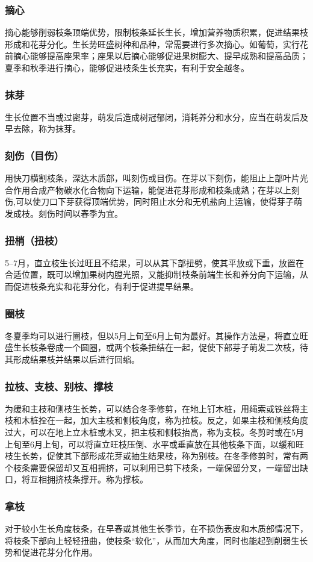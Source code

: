 \documentclass{ctexbook}
\begin{document}
\subsubsection{摘心}
摘心能够削弱枝条顶端优势，限制枝条延长生长，增加营养物质积累，促进结果枝形成和花芽分化。生长势旺盛树种和品种，常需要进行多次摘心。如葡萄，实行花前摘心能够提高座果率；座果以后摘心能够促进果树膨大、提早成熟和提高品质；夏季和秋季进行摘心，能够促进枝条生长充实，有利于安全越冬。
\subsubsection{抹芽}
生长位置不当或过密芽，萌发后造成树冠郁闭，消耗养分和水分，应当在萌发后及早去除，称为抹芽。
\subsubsection{刻伤（目伤）}
用快刀横割枝条，深达木质部，叫刻伤或目伤。在芽以下刻伤，能阻止上部叶片光合作用合成产物碳水化合物向下运输，能促进花芽形成和枝条成熟；在芽以上刻伤,可以使刀口下芽获得顶端优势，同时阻止水分和无机盐向上运输，使得芽子萌发成枝。刻伤时间以春季为宜。
\subsubsection{扭梢（扭枝）}
5--7月，直立枝生长过旺且不结果，可以从其下部扭劈，使其平放或下垂，放置在合适位置，既可以增加果树内膛光照，又能抑制枝条前端生长和养分向下运输，从而促进枝条充实和花芽分化，有利于促进提早结果。
\subsubsection{圈枝}
冬夏季均可以进行圈枝，但以5月上旬至6月上旬为最好。其操作方法是，将直立旺盛生长枝条卷成一个圆圈，或两个枝条扭结在一起，促使下部芽子萌发二次枝，待其形成结果枝并结果以后进行回缩。
\subsubsection{拉枝、支枝、别枝、撑枝}
为缓和主枝和侧枝生长势，可以结合冬季修剪，在地上钉木桩，用绳索或铁丝将主枝和木桩拴在一起，加大主枝和侧枝角度，称为拉枝。反之，如果主枝和侧枝角度过大，可以在地上立木桩或木叉，把主枝和侧枝抬高，称为支枝。冬剪时或在5月上旬至6月上旬，可以将直立旺枝压倒、水平或垂直放在其他枝条下面，以缓和旺枝生长势，促使其下部形成花芽或抽生结果枝，称为别枝。在冬季修剪时，常有两个枝条需要保留却又互相拥挤，可以利用已剪下枝条，一端保留分叉，一端留出缺口，将互相拥挤枝条撑开。称为撑枝。
\subsubsection{拿枝}
对于较小生长角度枝条，在早春或其他生长季节，在不损伤表皮和木质部情况下，将枝条下部向上轻轻扭曲，使枝条“软化”，从而加大角度，同时也能起到削弱生长势和促进花芽分化作用。
\end{document}
